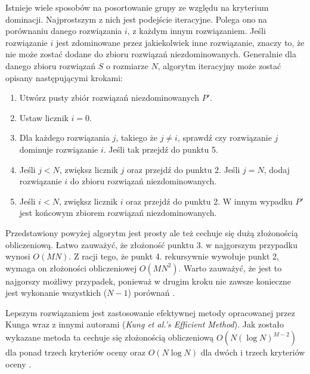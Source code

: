 \documentclass[twoside]{iisthesis}
\begin{document}
Istnieje wiele sposobów na posortowanie grupy ze względu na kryterium dominacji. Najprostszym z nich jest podejście iteracyjne. Polega ono na porównaniu danego rozwiązania $i$, z każdym innym rozwiązaniem. Jeśli rozwiązanie $i$ jest zdominowane przez jakiekolwiek inne rozwiązanie, znaczy to, że nie może zostać dodane do zbioru rozwiązań niezdominowanych. Generalnie dla danego zbioru rozwiązań $S$ o rozmiarze $N$, algorytm iteracyjny może zostać opisany następującymi krokami:\\

\begin{enumerate}
	\item Utwórz pusty zbiór rozwiązań niezdominowanych $P'$.
	\item Ustaw licznik $i = 0$.
	\item Dla każdego rozwiązania $j$, takiego że $j \neq i$, sprawdź czy rozwiązanie $j$ dominuje rozwiązanie $i$. Jeśli tak przejdź do punktu 5.
	\item Jeśli $j < N$, zwiększ licznik $j$ oraz przejdź do punktu 2. Jeśli $j = N$, dodaj rozwiązanie $i$ do zbioru rozwiązań niezdominowanych.
	\item Jeśli $i < N$, zwiększ licznik $i$ oraz przejdź do punktu 2. W innym wypadku $P'$ jest końcowym zbiorem rozwiązań niezdominowanych.\\
\end{enumerate}
Przedstawiony powyżej algorytm jest prosty ale też cechuje się dużą złożonością obliczeniową. Łatwo zauważyć, że złożoność punktu 3. w najgorszym przypadku wynosi $O(MN)$. Z racji tego, że punkt 4. rekursywnie wywołuje punkt 2, wymaga on złożoności obliczeniowej $O(MN^{2})$. Warto zauważyć, że jest to najgorszy możliwy przypadek, ponieważ w drugim kroku nie zawsze konieczne jest wykonanie wszystkich ($N-1$) porównań \cite{book}.

Lepszym rozwiązaniem jest zastosowanie efektywnej metody opracowanej przez Kunga wraz z innymi autorami (\textit{Kung et al.'s Efficient Method}). Jak zostało wykazane metoda ta cechuje się złożonością obliczeniową $O(N(\log N)^{M-2})$ dla ponad trzech kryteriów oceny oraz $O(N\log N)$ dla dwóch i trzech kryteriów oceny \cite{kung}.
\end{document}
